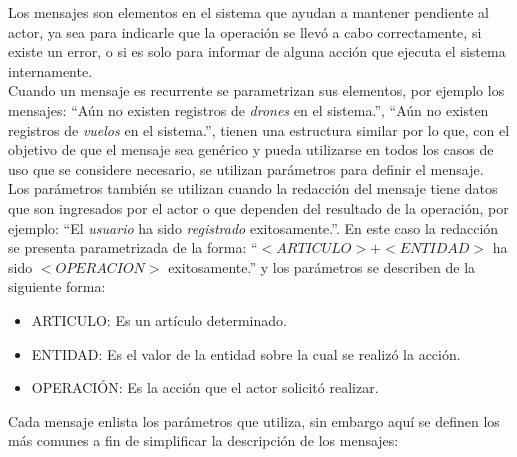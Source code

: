 %

Los mensajes son elementos en el sistema que ayudan a mantener pendiente al 
actor, ya sea para indicarle que la operación se llevó a cabo correctamente, si 
existe un error, o si es solo para informar de alguna acción que ejecuta el 
sistema internamente. \\

Cuando un mensaje es recurrente se parametrizan sus elementos, por ejemplo los mensajes: ``Aún no existen registros de \textit{drones} en el sistema.'', ``Aún no existen registros de \textit{vuelos} en el sistema.'', tienen una estructura similar 
por lo que, con el objetivo de que el mensaje sea genérico y pueda utilizarse en todos los casos de uso que se considere necesario, se utilizan parámetros para definir el mensaje.\\

Los parámetros también se utilizan cuando la redacción del mensaje tiene datos que son ingresados por el actor o que dependen del resultado de la operación, por ejemplo: 
``El \textit{usuario} ha sido \textit{registrado} exitosamente.''. En este caso la redacción se presenta parametrizada de la forma: ``$<ARTICULO> + <ENTIDAD>$ ha sido $<OPERACION>$ exitosamente.'' y los parámetros se describen de la siguiente forma:

\begin{itemize}
	\item ARTICULO: Es un artículo determinado.
	\item ENTIDAD: Es el valor de la entidad sobre la cual se realizó la acción.
	\item OPERACIÓN: Es la acción que el actor solicitó realizar.
\end{itemize}

Cada mensaje enlista los parámetros  que utiliza, sin embargo aquí se definen los más comunes a fin de simplificar la descripción de los mensajes:

